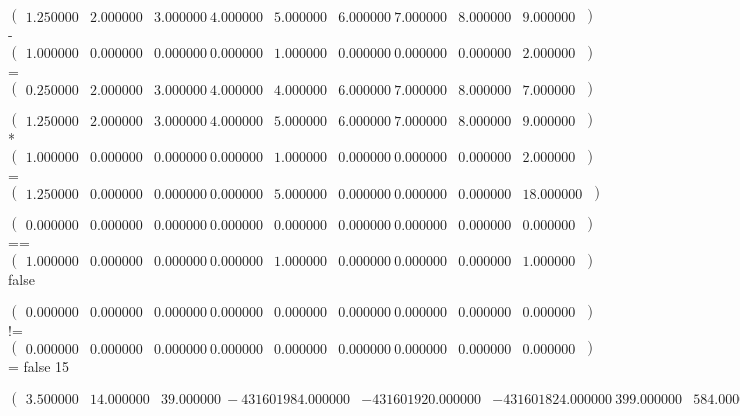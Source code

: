 $\begin{pmatrix}
1.250000 & 2.000000 & 3.000000\
4.000000 & 5.000000 & 6.000000\
7.000000 & 8.000000 & 9.000000\
\end{pmatrix}$ - 
$\begin{pmatrix}
1.000000 & 0.000000 & 0.000000\
0.000000 & 1.000000 & 0.000000\
0.000000 & 0.000000 & 2.000000\
\end{pmatrix}$ = 
$\begin{pmatrix}
0.250000 & 2.000000 & 3.000000\
4.000000 & 4.000000 & 6.000000\
7.000000 & 8.000000 & 7.000000\
\end{pmatrix}$

$\begin{pmatrix}
1.250000 & 2.000000 & 3.000000\
4.000000 & 5.000000 & 6.000000\
7.000000 & 8.000000 & 9.000000\
\end{pmatrix}$ * 
$\begin{pmatrix}
1.000000 & 0.000000 & 0.000000\
0.000000 & 1.000000 & 0.000000\
0.000000 & 0.000000 & 2.000000\
\end{pmatrix}$ = 
$\begin{pmatrix}
1.250000 & 0.000000 & 0.000000\
0.000000 & 5.000000 & 0.000000\
0.000000 & 0.000000 & 18.000000\
\end{pmatrix}$

$\begin{pmatrix}
0.000000 & 0.000000 & 0.000000\
0.000000 & 0.000000 & 0.000000\
0.000000 & 0.000000 & 0.000000\
\end{pmatrix}$ == 
$\begin{pmatrix}
1.000000 & 0.000000 & 0.000000\
0.000000 & 1.000000 & 0.000000\
0.000000 & 0.000000 & 1.000000\
\end{pmatrix}$ false

$\begin{pmatrix}
0.000000 & 0.000000 & 0.000000\
0.000000 & 0.000000 & 0.000000\
0.000000 & 0.000000 & 0.000000\
\end{pmatrix}$ != 
$\begin{pmatrix}
0.000000 & 0.000000 & 0.000000\
0.000000 & 0.000000 & 0.000000\
0.000000 & 0.000000 & 0.000000\
\end{pmatrix}$ = false
15

$\begin{pmatrix}
3.500000 & 14.000000 & 39.000000\
-431601984.000000 & -431601920.000000 & -431601824.000000\
399.000000 & 584.000000 & 820.000000\
\end{pmatrix}$
